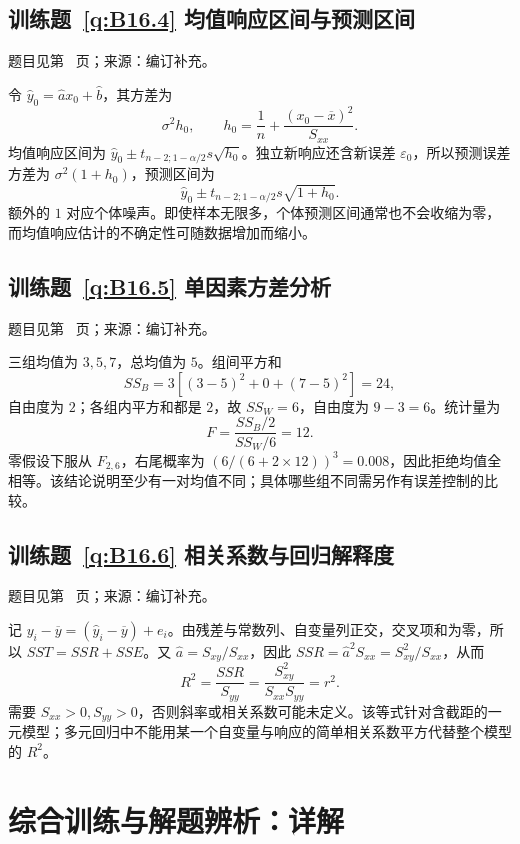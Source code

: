 \subsection*{训练题~\ref{q:B16.4} 均值响应区间与预测区间}\label{a:B16.4}{\small 题目见第~\pageref{q:B16.4} 页；来源：编订补充。}
\begin{solve}令 $\widehat y_0=\widehat a x_0+\widehat b$，其方差为\[\sigma^2h_0,\qquad h_0=\frac1n+\frac{(x_0-\overline x)^2}{S_{xx}}.\]均值响应区间为 $\widehat y_0\pm t_{n-2;1-\alpha/2}s\sqrt{h_0}$。独立新响应还含新误差 $\varepsilon_0$，所以预测误差方差为 $\sigma^2(1+h_0)$，预测区间为\[\widehat y_0\pm t_{n-2;1-\alpha/2}s\sqrt{1+h_0}.\]额外的 $1$ 对应个体噪声。即使样本无限多，个体预测区间通常也不会收缩为零，而均值响应估计的不确定性可随数据增加而缩小。\end{solve}

\subsection*{训练题~\ref{q:B16.5} 单因素方差分析}\label{a:B16.5}{\small 题目见第~\pageref{q:B16.5} 页；来源：编订补充。}
\begin{solve}三组均值为 $3,5,7$，总均值为 $5$。组间平方和\[SS_B=3[(3-5)^2+0+(7-5)^2]=24,\]自由度为 $2$；各组内平方和都是 $2$，故 $SS_W=6$，自由度为 $9-3=6$。统计量为\[F=\frac{SS_B/2}{SS_W/6}=12.\]零假设下服从 $F_{2,6}$，右尾概率为 $(6/(6+2\times12))^3=0.008$，因此拒绝均值全相等。该结论说明至少有一对均值不同；具体哪些组不同需另作有误差控制的比较。\end{solve}

\subsection*{训练题~\ref{q:B16.6} 相关系数与回归解释度}\label{a:B16.6}{\small 题目见第~\pageref{q:B16.6} 页；来源：编订补充。}
\begin{solve}记 $y_i-\overline y=(\widehat y_i-\overline y)+e_i$。由残差与常数列、自变量列正交，交叉项和为零，所以 $SST=SSR+SSE$。又 $\widehat a=S_{xy}/S_{xx}$，因此 $SSR=\widehat a^2S_{xx}=S_{xy}^2/S_{xx}$，从而\[R^2=\frac{SSR}{S_{yy}}=\frac{S_{xy}^2}{S_{xx}S_{yy}}=r^2.\]需要 $S_{xx}>0,S_{yy}>0$，否则斜率或相关系数可能未定义。该等式针对含截距的一元模型；多元回归中不能用某一个自变量与响应的简单相关系数平方代替整个模型的 $R^2$。\end{solve}

\clearpage\section*{综合训练与解题辨析：详解}

